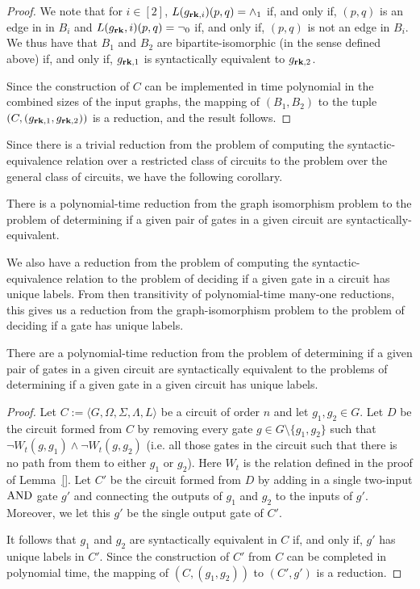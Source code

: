 \documentclass[../paper.tex]{subfiles}
\begin{document}
\begin{proof}
  We note that for $i \in [2]$, $L(g_{\text{\textbf{rk}}, i})(p,q) = \land_1$ if, and only
  if, $(p,q)$ is an edge in in $B_i$ and $L(g_{\text{\textbf{rk}}}, i)(p,q) = \neg_0$ if, and
  only if, $(p,q)$ is not an edge in $B_i$. We thus have that $B_1$ and $B_2$
  are bipartite-isomorphic (in the sense defined above) if, and only if,
  $g_{\text{\textbf{rk}}, 1}$ is syntactically equivalent to $g_{\text{\textbf{rk}}, 2}$.

  Since the construction of $C$ can be implemented in time polynomial in the
  combined sizes of the input graphs, the mapping of $(B_1, B_2)$ to the tuple
  $(C, (g_{\text{\textbf{rk}}, 1}, g_{\text{\textbf{rk}}, 2}))$ is a reduction, and the result follows.
\end{proof}

Since there is a trivial reduction from the problem of computing the
syntactic-equivalence relation over a restricted class of circuits to the
problem over the general class of circuits, we have the following corollary.

\begin{cor}
  There is a polynomial-time reduction from the graph isomorphism problem to the
  problem of determining if a given pair of gates in a given circuit are
  syntactically-equivalent.
  \label{lem:syntactically-equivilent-general-hard}
\end{cor}

We also have a reduction from the problem of computing the syntactic-equivalence
relation to the problem of deciding if a given gate in a circuit has unique
labels. From then transitivity of polynomial-time many-one reductions, this gives
us a reduction from the graph-isomorphism problem to the problem of deciding if
a gate has unique labels.

\begin{lem}
  There are a polynomial-time reduction from the problem of determining if a
  given pair of gates in a given circuit are syntactically equivalent to the
  problems of determining if a given gate in a given circuit has unique labels.
  \label{lem:syntactically-equivalent-unique-labels}
\end{lem}

\begin{proof}
  Let $C := \langle G, \Omega, \Sigma, \Lambda, L \rangle$ be a circuit of order
  $n$ and let $g_1, g_2 \in G$. Let $D$ be the circuit formed from $C$ by
  removing every gate $g \in G \setminus\{g_1, g_2\}$ such that $\neg W_t(g,
  g_1) \land \neg W_t(g, g_2)$ (i.e. all those gates in the circuit such that
  there is no path from them to either $g_1$ or $g_2$). Here $W_t$ is the
  relation defined in the proof of Lemma~\ref{}. Let $C'$ be the circuit formed
  from $D$ by adding in a single two-input $\text{\upshape AND}$ gate $g'$ and connecting the
  outputs of $g_1$ and $g_2$ to the inputs of $g'$. Moreover, we let this $g'$
  be the single output gate of $C'$.

  It follows that $g_1$ and $g_2$ are syntactically equivalent in $C$ if, and
  only if, $g'$ has unique labels in $C'$. Since the construction of $C'$ from
  $C$ can be completed in polynomial time, the mapping of $(C, (g_1, g_2))$ to
  $(C', g')$ is a reduction.
\end{proof}
\end{document}
